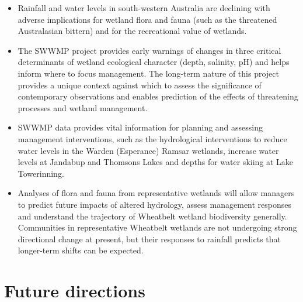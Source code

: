 \documentclass[version=last,
    paper=a4, %
    10pt, %
    usenames,
    dvipsnames,
    oneside, %
    headings=openany, %
    DIV=15 %
]{scrbook}
\begin{document}
\begin{itemize}
\itemsep1pt\parskip0pt
\item
  Rainfall and water levels in south-western Australia are declining
  with adverse implications for wetland flora and fauna (such as the
  threatened Australasian bittern) and for the recreational value of
  wetlands.
\item
  The SWWMP project provides early warnings of changes in three critical
  determinants of wetland ecological character (depth, salinity, pH) and
  helps inform where to focus management. The long-term nature of this
  project provides a unique context against which to assess the
  significance of contemporary observations and enables prediction of
  the effects of threatening processes and wetland management.
\item
  SWWMP data provides vital information for planning and assessing
  management interventions, such as the hydrological interventions to
  reduce water levels in the Warden (Esperance) Ramsar wetlands,
  increase water levels at Jandabup and Thomsons Lakes and depths for
  water skiing at Lake Towerinning.
\item
  Analyses of flora and fauna from representative wetlands will allow
  managers to predict future impacts of altered hydrology, assess
  management responses and understand the trajectory of Wheatbelt
  wetland biodiversity generally. Communities in representative
  Wheatbelt wetlands are not undergoing strong directional change at
  present, but their responses to rainfall predicts that longer-term
  shifts can be expected.
\end{itemize}




\section*{Future directions}
\end{document}
